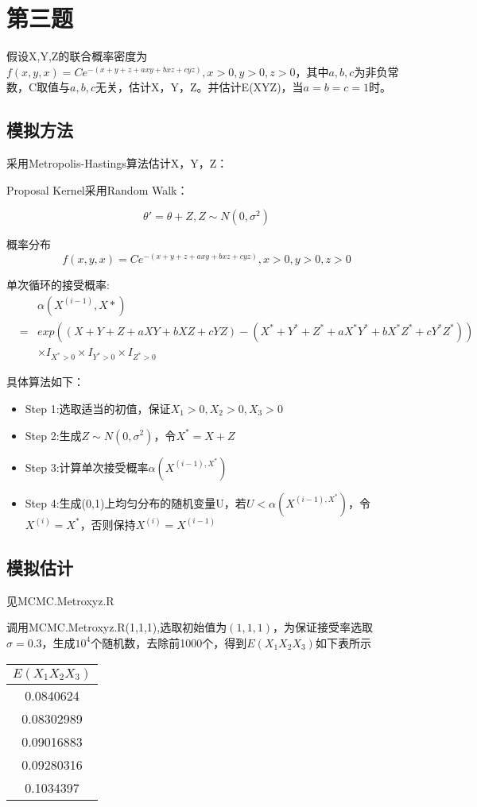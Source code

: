 \documentclass{ctexart}
\begin{document}
\section{第三题}

假设X,Y,Z的联合概率密度为\(f(x,y,x)=C e^{-(x+y+z+axy+bxz+cyz)},x>0,y>0,z>0\)，其中\(a,b,c\)为非负常数，C取值与\(a,b,c\)无关，估计X，Y，Z。并估计E(XYZ)，当\(a=b=c=1\)时。

\subsection{模拟方法}

采用Metropolis-Hastings算法估计X，Y，Z：

Proposal Kernel采用Random Walk：

\[
\theta'=\theta+Z,Z\sim N(0,\sigma^2)
\]

概率分布
\[f(x,y,x)=C e^{-(x+y+z+axy+bxz+cyz)},x>0,y>0,z>0\]

单次循环的接受概率:
\begin{eqnarray*}
& &\alpha(X^{(i-1)},X*)\\
&=&exp((X+Y+Z+aXY+bXZ+cYZ)-(X^*+Y^*+Z^*+aX^*Y^*+bX^*Z^*+cY^*Z^*))\\
& &\times I_{X^*>0}\times I_{Y^*>0}\times I_{Z^*>0}
\end{eqnarray*}

具体算法如下：
\begin{itemize} 
\item Step 1:选取适当的初值，保证\(X_1>0,X_2>0,X_3>0\)
\item Step 2:生成\(Z \sim N(0,\sigma^2)\)，令\(X^*=X+Z\)
\item Step 3:计算单次接受概率\(\alpha(X^{(i-1),X^*})\)
\item Step 4:生成(0,1)上均匀分布的随机变量U，若\(U<\alpha(X^{(i-1),X^*})\)，令\(X^{(i)}=X^*\)，否则保持\(X^{(i)}=X^{(i-1)}\)
\end{itemize}

\subsection{模拟估计}

见MCMC.Metroxyz.R

调用MCMC.Metroxyz.R(1,1,1),选取初始值为\((1,1,1)\)，为保证接受率选取\(\sigma=0.3\)，生成\(10^4\)个随机数，去除前1000个，得到\(E(X_1X_2X_3)\)如下表所示
   
   
\begin{table}[h]
\centering
\begin{tabular}{| c | }
          \hline
          \bf $E(X_1 X_2 X_3)$ \\
          \hline
   0.0840624  \\
          \hline
 0.08302989 \\
          \hline
       0.09016883\\
          \hline
 0.09280316\\
\hline
0.1034397\\
\hline
\end{tabular}
\end{table}
\end{document}
